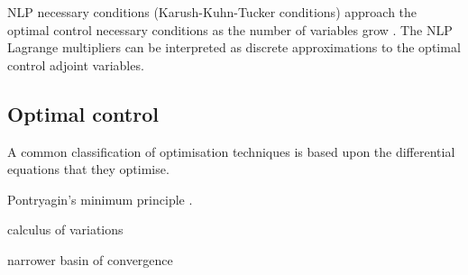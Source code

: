 
%
%

NLP necessary conditions (Karush-Kuhn-Tucker conditions) approach the optimal control necessary conditions as the number of variables grow \parencite{Betts1998}. The NLP Lagrange multipliers can be interpreted as discrete approximations to the optimal control adjoint variables.

\subsection{Optimal control}

A common classification of optimisation techniques is based upon the differential equations that they optimise. 

Pontryagin's minimum principle \textcite{Pontryagin1962}.

calculus of variations

narrower basin of convergence



